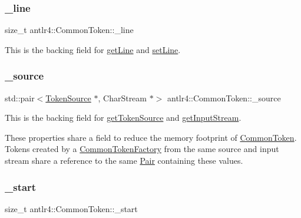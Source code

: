 \subsubsection{\texorpdfstring{\+\_\+line}{\_line}}
{\footnotesize\ttfamily size\+\_\+t antlr4\+::\+Common\+Token\+::\+\_\+line\hspace{0.3cm}{\ttfamily [protected]}}

This is the backing field for \hyperlink{classantlr4_1_1CommonToken_afcec0cd6385a80ca3d8a093410c67a8a}{get\+Line} and \hyperlink{}{set\+Line}. \mbox{\label{classantlr4_1_1CommonToken_af90c2b9365ae2ff2691203787df762ba}} 
\subsubsection{\texorpdfstring{\+\_\+source}{\_source}}
{\footnotesize\ttfamily std\+::pair$<$\hyperlink{classantlr4_1_1TokenSource}{Token\+Source} $\ast$, Char\+Stream $\ast$$>$ antlr4\+::\+Common\+Token\+::\+\_\+source\hspace{0.3cm}{\ttfamily [protected]}}

This is the backing field for \hyperlink{classantlr4_1_1CommonToken_ae8d14ee67c97dd27256433be18dca59a}{get\+Token\+Source} and \hyperlink{classantlr4_1_1CommonToken_a1e5158adbee78524995778468f45ed37}{get\+Input\+Stream}.

These properties share a field to reduce the memory footprint of \hyperlink{classantlr4_1_1CommonToken}{Common\+Token}. Tokens created by a \hyperlink{classantlr4_1_1CommonTokenFactory}{Common\+Token\+Factory} from the same source and input stream share a reference to the same \hyperlink{}{Pair} containing these values.\mbox{\label{classantlr4_1_1CommonToken_ad5c165b3dea24673a81f80570fc24e6a}} 
\subsubsection{\texorpdfstring{\+\_\+start}{\_start}}
{\footnotesize\ttfamily size\+\_\+t antlr4\+::\+Common\+Token\+::\+\_\+start\hspace{0.3cm}{\ttfamily [protected]}}

